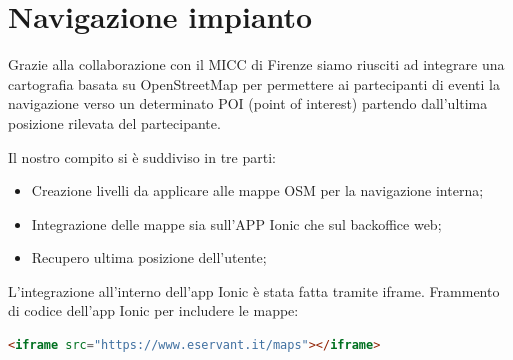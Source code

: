\section{Navigazione impianto}
Grazie alla collaborazione con il MICC di Firenze siamo riusciti ad integrare una cartografia basata su OpenStreetMap
per permettere ai partecipanti di eventi la navigazione verso un determinato POI (point of interest) partendo
dall'ultima posizione rilevata del partecipante.

Il nostro compito si è suddiviso in tre parti:
\begin{itemize}
\item Creazione livelli da applicare alle mappe OSM per la navigazione interna;
\item Integrazione delle mappe sia sull'APP Ionic che sul backoffice web;
\item Recupero ultima posizione dell'utente;
\end{itemize}

L'integrazione all'interno dell'app Ionic è stata fatta
tramite iframe.
Frammento di codice dell'app Ionic per includere le mappe:
\begin{lstlisting}[language=html]
<iframe src="https://www.eservant.it/maps"></iframe>
\end{lstlisting}

